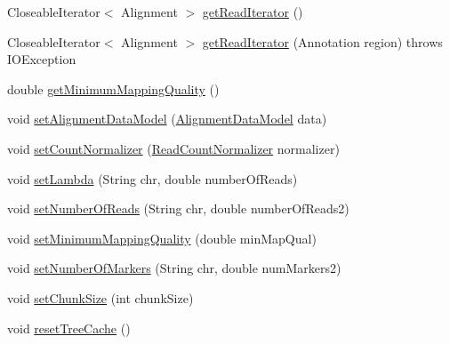 \begin{DoxyCompactItemize}
\item 
Closeable\+Iterator$<$ Alignment $>$ \hyperlink{classbroad_1_1pda_1_1seq_1_1segmentation_1_1_alignment_data_model_stats_a4ed82b6e487a66caa164f7e0dd62dad0}{get\+Read\+Iterator} ()
\item 
Closeable\+Iterator$<$ Alignment $>$ \hyperlink{classbroad_1_1pda_1_1seq_1_1segmentation_1_1_alignment_data_model_stats_aed73c1bc87882923e37e9d2deab47ced}{get\+Read\+Iterator} (Annotation region)  throws I\+O\+Exception
\item 
double \hyperlink{classbroad_1_1pda_1_1seq_1_1segmentation_1_1_alignment_data_model_stats_a8a6731855b1e14f18bde6403c224e48b}{get\+Minimum\+Mapping\+Quality} ()
\item 
void \hyperlink{classbroad_1_1pda_1_1seq_1_1segmentation_1_1_alignment_data_model_stats_aa2efb2a40faf2b836fc838c5e740836b}{set\+Alignment\+Data\+Model} (\hyperlink{interfacebroad_1_1pda_1_1seq_1_1segmentation_1_1_alignment_data_model}{Alignment\+Data\+Model} data)
\item 
void \hyperlink{classbroad_1_1pda_1_1seq_1_1segmentation_1_1_alignment_data_model_stats_a94bb6e80732d15b31ff18425e5a8481e}{set\+Count\+Normalizer} (\hyperlink{interfacebroad_1_1pda_1_1seq_1_1segmentation_1_1_read_count_normalizer}{Read\+Count\+Normalizer} normalizer)
\item 
void \hyperlink{classbroad_1_1pda_1_1seq_1_1segmentation_1_1_alignment_data_model_stats_a6ba57d21a9ba6a7eca2a7f04fa0c4c3d}{set\+Lambda} (String chr, double number\+Of\+Reads)
\item 
void \hyperlink{classbroad_1_1pda_1_1seq_1_1segmentation_1_1_alignment_data_model_stats_aae2a2bc92f81bc8d50824672a3f5eb55}{set\+Number\+Of\+Reads} (String chr, double number\+Of\+Reads2)
\item 
void \hyperlink{classbroad_1_1pda_1_1seq_1_1segmentation_1_1_alignment_data_model_stats_a30c869716b5df7ddf3523efb81579fc8}{set\+Minimum\+Mapping\+Quality} (double min\+Map\+Qual)
\item 
void \hyperlink{classbroad_1_1pda_1_1seq_1_1segmentation_1_1_alignment_data_model_stats_ac76896063c3a3f4b477649154a3ef41c}{set\+Number\+Of\+Markers} (String chr, double num\+Markers2)
\item 
void \hyperlink{classbroad_1_1pda_1_1seq_1_1segmentation_1_1_alignment_data_model_stats_a896c96747a76fd0c169bbb694622fd33}{set\+Chunk\+Size} (int chunk\+Size)
\item 
void \hyperlink{classbroad_1_1pda_1_1seq_1_1segmentation_1_1_alignment_data_model_stats_a546239b431aa2a3947c88c4cc2f722c8}{reset\+Tree\+Cache} ()

\end{DoxyCompactItemize}
